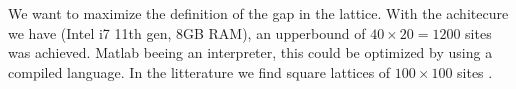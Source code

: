 \documentclass[../main.tex]{subfile}
\begin{document}
We want to maximize the definition of the gap in the lattice. With the achitecure we have (Intel i7 11th gen, 8GB RAM),
an upperbound of $40\times20=1200$ sites was achieved. Matlab beeing an interpreter, this could be optimized by using a compiled language.
In the litterature we find square lattices of $100\times100$ sites \cite{Mjos2019}. \\

%     
\end{document}

